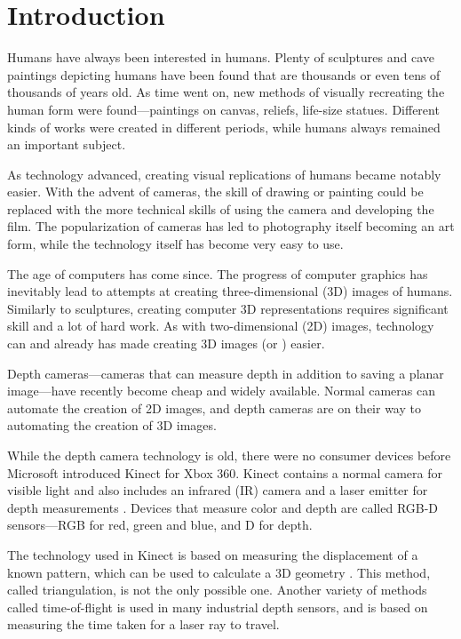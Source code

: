 \chapter{Introduction}

Humans have always been interested in humans. Plenty of sculptures and cave paintings depicting humans have been found that are thousands or even tens of thousands of years old. As time went on, new methods of visually recreating the human form were found---paintings on canvas, reliefs, life-size statues. Different kinds of works were created in different periods, while humans always remained an important subject.

As technology advanced, creating visual replications of humans became notably easier. With the advent of cameras, the skill of drawing or painting could be replaced with the more technical skills of using the camera and developing the film. The popularization of cameras has led to photography itself becoming an art form, while the technology itself has become very easy to use.

The age of computers has come since. The progress of computer graphics has inevitably lead to attempts at creating three-dimensional (3D) images of humans. Similarly to sculptures, creating computer 3D representations requires significant skill and a lot of hard work. As with two-dimensional (2D) images, technology can and already has made creating 3D images (or ) easier.

Depth cameras---cameras that can measure depth in addition to saving a planar image---have recently become cheap and widely available. Normal cameras can automate the creation of 2D images, and depth cameras are on their way to automating the creation of 3D images.

While the depth camera technology is old, there were no consumer devices before Microsoft introduced Kinect for Xbox 360. Kinect contains a normal camera for visible light and also includes an infrared (IR) camera and a laser emitter for depth measurements \citep{fisher2010}. Devices that measure color and depth are called RGB-D sensors---RGB for red, green and blue, and D for depth.

The technology used in Kinect is based on measuring the displacement of a known pattern, which can be used to calculate a 3D geometry \citep{reichinger2011}. This method, called triangulation, is not the only possible one. Another variety of methods called time-of-flight is used in many industrial depth sensors, and is based on measuring the time taken for a laser ray to travel.

